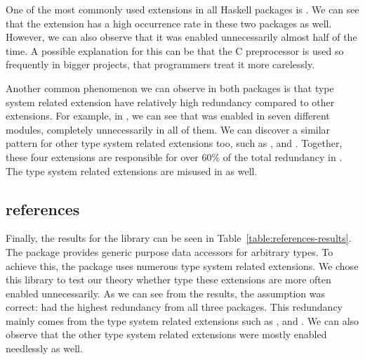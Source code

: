 \documentclass[main.tex]{subfiles}
\begin{document}
	One of the most commonly used extensions in all Haskell packages is . We can see that the extension has a high occurrence rate in these two packages as well. However, we can also observe that it was enabled unnecessarily almost half of the time. A possible explanation for this can be that the C preprocessor is used so frequently in bigger projects, that programmers treat it more carelessly.
	
	Another common phenomenon we can observe in both packages is that type system related extension have relatively high redundancy compared to other extensions. For example, in , we can see that  was enabled in seven different modules, completely unnecessarily in all of them. We can discover a similar pattern for other type system related extensions too, such as ,  and . Together, these four extensions are responsible for over 60\% of the total redundancy in . The type system related extensions are misused in  as well.
	
	\subsection{references}
	
	Finally, the results for the  library can be seen in Table~\ref{table:references-results}.	The  package provides generic purpose data accessors for arbitrary types. To achieve this, the package uses numerous type system related extensions.	We chose this library to test our theory whether type these extensions are more often enabled unnecessarily. As we can see from the results, the assumption was correct:  had the highest redundancy from all three packages. This redundancy mainly comes from the type system related extensions such as ,  and . We can also observe that the other type system related extensions were mostly enabled needlessly as well.
	
\end{document}
